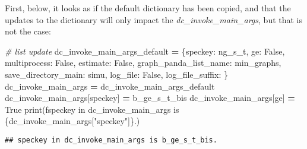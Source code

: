 \documentclass[
]{book}
\newenvironment{Shaded}{\begin{snugshade}}{\end{snugshade}}
\newcommand{\BuiltInTok}[1]{#1}
\newcommand{\CommentTok}[1]{\textcolor[rgb]{0.56,0.35,0.01}{\textit{#1}}}
\newcommand{\NormalTok}[1]{#1}
\newcommand{\OperatorTok}[1]{\textcolor[rgb]{0.81,0.36,0.00}{\textbf{#1}}}
\newcommand{\SpecialCharTok}[1]{\textcolor[rgb]{0.00,0.00,0.00}{#1}}
\newcommand{\SpecialStringTok}[1]{\textcolor[rgb]{0.31,0.60,0.02}{#1}}
\newcommand{\StringTok}[1]{\textcolor[rgb]{0.31,0.60,0.02}{#1}}
\newcommand{\VariableTok}[1]{\textcolor[rgb]{0.00,0.00,0.00}{#1}}
\begin{document}
First, below, it looks as if the default dictionary has been copied, and that the updates to the dictionary will only impact the \emph{dc\_invoke\_main\_args}, but that is not the case:

\begin{Shaded}
\begin{Highlighting}[]
\CommentTok{\# list update}
\NormalTok{dc\_invoke\_main\_args\_default }\OperatorTok{=}\NormalTok{ \{}\StringTok{\textquotesingle{}speckey\textquotesingle{}}\NormalTok{: }\StringTok{\textquotesingle{}ng\_s\_t\textquotesingle{}}\NormalTok{,}
                               \StringTok{\textquotesingle{}ge\textquotesingle{}}\NormalTok{: }\VariableTok{False}\NormalTok{,}
                               \StringTok{\textquotesingle{}multiprocess\textquotesingle{}}\NormalTok{: }\VariableTok{False}\NormalTok{,}
                               \StringTok{\textquotesingle{}estimate\textquotesingle{}}\NormalTok{: }\VariableTok{False}\NormalTok{,}
                               \StringTok{\textquotesingle{}graph\_panda\_list\_name\textquotesingle{}}\NormalTok{: }\StringTok{\textquotesingle{}min\_graphs\textquotesingle{}}\NormalTok{,}
                               \StringTok{\textquotesingle{}save\_directory\_main\textquotesingle{}}\NormalTok{: }\StringTok{\textquotesingle{}simu\textquotesingle{}}\NormalTok{,}
                               \StringTok{\textquotesingle{}log\_file\textquotesingle{}}\NormalTok{: }\VariableTok{False}\NormalTok{,}
                               \StringTok{\textquotesingle{}log\_file\_suffix\textquotesingle{}}\NormalTok{: }\StringTok{\textquotesingle{}\textquotesingle{}}\NormalTok{\}}
\NormalTok{dc\_invoke\_main\_args }\OperatorTok{=}\NormalTok{ dc\_invoke\_main\_args\_default}
\NormalTok{dc\_invoke\_main\_args[}\StringTok{\textquotesingle{}speckey\textquotesingle{}}\NormalTok{] }\OperatorTok{=} \StringTok{\textquotesingle{}b\_ge\_s\_t\_bis\textquotesingle{}}
\NormalTok{dc\_invoke\_main\_args[}\StringTok{\textquotesingle{}ge\textquotesingle{}}\NormalTok{] }\OperatorTok{=} \VariableTok{True}
\BuiltInTok{print}\NormalTok{(}\SpecialStringTok{f\textquotesingle{}speckey in dc\_invoke\_main\_args is }\SpecialCharTok{\{}\NormalTok{dc\_invoke\_main\_args[}\StringTok{"speckey"}\NormalTok{]}\SpecialCharTok{\}}\SpecialStringTok{.\textquotesingle{}}\NormalTok{)}
\end{Highlighting}
\end{Shaded}

\begin{verbatim}
## speckey in dc_invoke_main_args is b_ge_s_t_bis.
\end{verbatim}
\end{document}
